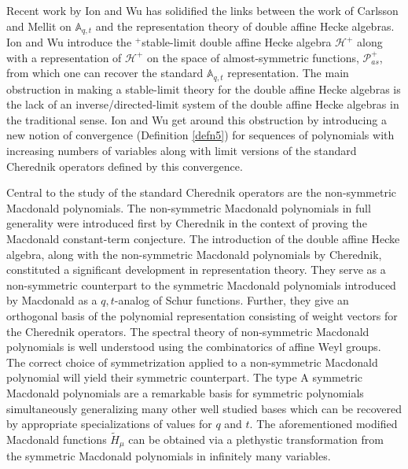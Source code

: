 Recent work by Ion and Wu \cite{Ion_2022} has solidified the links between the work of Carlsson and Mellit on $\mathbb{A}_{q,t}$ and the representation theory of double affine Hecke algebras. Ion and Wu introduce the $^+$stable-limit double affine Hecke algebra $\mathscr{H}^{+}$ along with a representation of $\mathscr{H}^{+}$ on the space of almost-symmetric functions, $\mathscr{P}_{as}^{+}$, from which one can recover the standard $\mathbb{A}_{q,t}$ representation. The main obstruction in making a stable-limit theory for the double affine Hecke algebras is the lack of an inverse/directed-limit system of the double affine Hecke algebras in the traditional sense. Ion and Wu get around this obstruction by introducing a new notion of convergence (Definition \ref{defn5}) for sequences of polynomials with increasing numbers of variables along with limit versions of the standard Cherednik operators defined by this convergence. 

Central to the study of the standard Cherednik operators are the non-symmetric Macdonald polynomials. The non-symmetric Macdonald polynomials in full generality were introduced first by Cherednik \cite{C_2003} in the context of proving the Macdonald constant-term conjecture. The introduction of the double affine Hecke algebra, along with the non-symmetric Macdonald polynomials by Cherednik, constituted a significant development in representation theory. They serve as a non-symmetric counterpart to the symmetric Macdonald polynomials introduced by Macdonald as a $q,t$-analog of Schur functions. Further, they give an orthogonal basis of the polynomial representation consisting of weight vectors for the Cherednik operators. The spectral theory of non-symmetric Macdonald polynomials is well understood using the combinatorics of affine Weyl groups. The correct choice of symmetrization applied to a non-symmetric Macdonald polynomial will yield their symmetric counterpart. The type A symmetric Macdonald polynomials are a remarkable basis for symmetric polynomials simultaneously generalizing many other well studied bases which can be recovered by appropriate specializations of values for $q$ and $t$. The aforementioned modified Macdonald functions $\widetilde{H}_{\mu}$ can be obtained via a plethystic transformation from the symmetric Macdonald polynomials in infinitely many variables.


